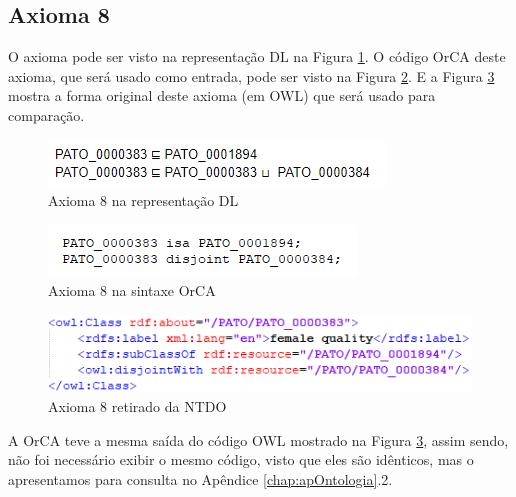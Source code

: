 \documentclass{bcc}
\begin{document}
\subsection{Axioma 8}
O axioma pode ser visto na representação DL na Figura \ref{fig:axioma8_dl}. O código OrCA deste axioma, que será usado como entrada, pode ser visto na Figura \ref{fig:axioma8_orca}. E a Figura \ref{fig:axioma8_o} mostra a forma original deste axioma (em OWL) que será usado para comparação. 

\begin{figure}[H]
\centering
\includegraphics[width=.5\textwidth]{Figuras/axioma8_dl.png}
\caption{Axioma 8 na representação DL} 
\label{fig:axioma8_dl}
\end{figure}

\begin{figure}[H]
\centering
\includegraphics[width=.5\textwidth]{Figuras/axioma8_orca.png}
\caption{Axioma 8 na sintaxe OrCA} 
\label{fig:axioma8_orca}
\end{figure}

\begin{figure}[H]
\centering
\includegraphics[width=.6\textwidth]{Figuras/axioma8_o.png}
\caption{Axioma 8 retirado da NTDO} 
\label{fig:axioma8_o}
\end{figure}

A OrCA teve a mesma saída do código OWL mostrado na Figura \ref{fig:axioma8_o}, assim sendo, não foi necessário exibir o mesmo código, visto que eles são idênticos, mas o apresentamos para consulta no Apêndice \ref{chap:apOntologia}.2.

\end{document}
